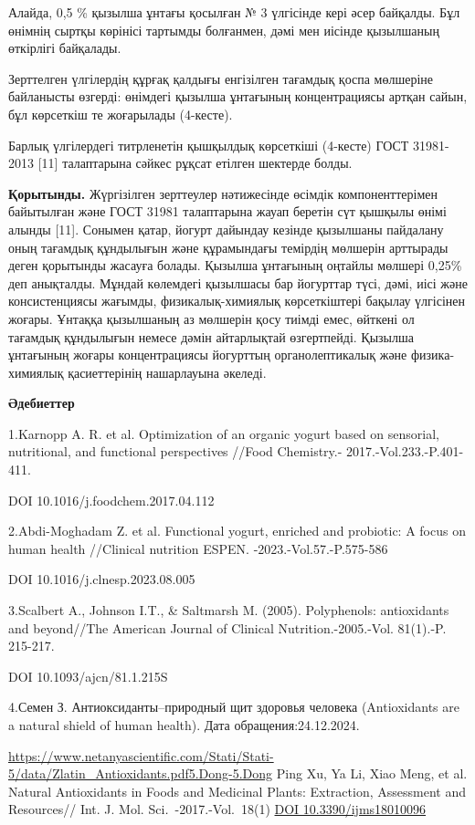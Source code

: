 Алайда, 0,5 \% қызылша ұнтағы қосылған № 3 үлгісінде кері әсер байқалды.
Бұл өнімнің сыртқы көрінісі тартымды болғанмен, дәмі мен иісінде
қызылшаның өткірлігі байқалады.

Зерттелген үлгілердің құрғақ қалдығы енгізілген тағамдық қоспа мөлшеріне
байланысты өзгерді: өнімдегі қызылша ұнтағының концентрациясы артқан
сайын, бұл көрсеткіш те жоғарылады (4-кесте).

Барлық үлгілердегі титрленетін қышқылдық көрсеткіші (4-кесте) ГОСТ
31981-2013 {[}11{]} талаптарына сәйкес рұқсат етілген шектерде болды.

{\bfseries Қорытынды.} Жүргізілген зерттеулер нәтижесінде өсімдік
компоненттерімен байытылған және ГОСТ 31981 талаптарына жауап беретін
сүт қышқылы өнімі алынды {[}11{]}. Сонымен қатар, йогурт дайындау
кезінде қызылшаны пайдалану оның тағамдық құндылығын және құрамындағы
темірдің мөлшерін арттырады деген қорытынды жасауға болады. Қызылша
ұнтағының оңтайлы мөлшері 0,25\% деп анықталды. Мұндай көлемдегі
қызылшасы бар йогурттар түсі, дәмі, иісі және консистенциясы жағымды,
физикалық-химиялық көрсеткіштері бақылау үлгісінен жоғары. Ұнтаққа
қызылшаның аз мөлшерін қосу тиімді емес, өйткені ол тағамдық құндылығын
немесе дәмін айтарлықтай өзгертпейді. Қызылша ұнтағының жоғары
концентрациясы йогурттың органолептикалық және физика-химиялық
қасиеттерінің нашарлауына әкеледі.

{\bfseries Әдебиеттер}

1.Karnopp A. R. et al. Optimization of an organic yogurt based on
sensorial, nutritional, and functional perspectives //Food Chemistry.-
2017.-Vol.233.-P.401-411.

DOI 10.1016/j.foodchem.2017.04.112

2.Abdi-Moghadam Z. et al. Functional yogurt, enriched and probiotic: A
focus on human health //Clinical nutrition ESPEN.
-2023.-Vol.57.-P.575-586

DOI 10.1016/j.clnesp.2023.08.005

3.Scalbert A., Johnson I.T., \& Saltmarsh M. (2005). Polyphenols:
antioxidants and beyond//The American Journal of Clinical
Nutrition.-2005.-Vol. 81(1).-P. 215-217.

DOI 10.1093/ajcn/81.1.215S

4.Семен З. Антиоксиданты--природный щит здоровья человека (Antioxidants
are a natural shield of human health). Дата обращения:24.12.2024.

\href{https://www.netanyascientific.com/Stati/Stati-5/data/Zlatin_Antioxidants.pdf5.Dong-5.Dong}{https://www.netanyascientific.com/Stati/Stati-5/data/Zlatin\_Antioxidants.pdf5.Dong-5.Dong}
Ping Xu, Ya Li, Xiao Meng, et al. Natural Antioxidants in Foods and
Medicinal Plants: Extraction, Assessment and Resources// Int. J. Mol.
Sci\emph{.}~-2017.-Vol.~18(1)
\href{https://doi.org/10.3390/ijms18010096}{DOI 10.3390/ijms18010096}

